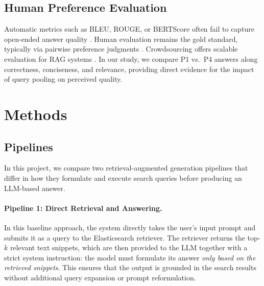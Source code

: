 \documentclass[manuscript,screen]{acmart}
\begin{document}
\begin{CCSXML}
	\subsection{Human Preference Evaluation}
	\label{subsec:human-preference-eval}
	Automatic metrics such as BLEU, ROUGE, or BERTScore often fail to capture open-ended answer quality \cite{post-2018-call,lin-2004-rouge,zhang2020bertscoreevaluatingtextgeneration}. Human evaluation remains the gold standard, typically via pairwise preference judgments \cite{bai2022traininghelpfulharmlessassistant,stiennon2022learningsummarizehumanfeedback}. Crowdsourcing offers scalable evaluation for RAG systems \cite{Gienapp_2025}. In our study, we compare P1 vs.~P4 answers along correctness, conciseness, and relevance, providing direct evidence for the impact of query pooling on perceived quality.

\section{Methods}

	\subsection{Pipelines}
	\label{subsec:pipelines}
	
	In this project, we compare two retrieval-augmented generation pipelines that
	differ in how they formulate and execute search queries before producing an
	LLM-based answer.
	
	\paragraph{Pipeline 1: Direct Retrieval and Answering.}
	In this baseline approach, the system directly takes the user’s input prompt
	and submits it as a query to the Elasticsearch retriever. The retriever returns the top-$k$ relevant text
	snippets, which are then provided to the LLM together with a
	strict system instruction: the model must formulate its answer \emph{only based
	on the retrieved snippets}. This ensures that the output is grounded in the
	search results without additional query expansion or prompt reformulation.
	
	\begin{figure}[H] %
		\centering
\end{figure}
\end{CCSXML}
\end{document}
